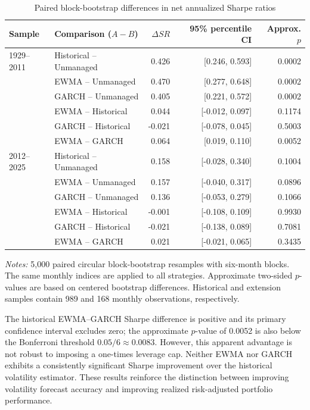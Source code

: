 \documentclass[11pt]{article}
\begin{document}
\begin{table}[htbp]
\centering
\caption{Paired block-bootstrap differences in net annualized Sharpe ratios}
\label{tab:bootstrap_sharpe}
\small
\begin{tabular}{llrrr}
\hline
Sample & Comparison ($A-B$) & $\Delta SR$ & 95\% percentile CI & Approx. $p$ \\
\hline
1929--2011 & Historical -- Unmanaged & 0.426 & [0.246, 0.593] & 0.0002 \\
 & EWMA -- Unmanaged & 0.470 & [0.277, 0.648] & 0.0002 \\
 & GARCH -- Unmanaged & 0.405 & [0.221, 0.572] & 0.0002 \\
 & EWMA -- Historical & 0.044 & [-0.012, 0.097] & 0.1174 \\
 & GARCH -- Historical & -0.021 & [-0.078, 0.045] & 0.5003 \\
 & EWMA -- GARCH & 0.064 & [0.019, 0.110] & 0.0052 \\
\hline
2012--2025 & Historical -- Unmanaged & 0.158 & [-0.028, 0.340] & 0.1004 \\
 & EWMA -- Unmanaged & 0.157 & [-0.040, 0.317] & 0.0896 \\
 & GARCH -- Unmanaged & 0.136 & [-0.053, 0.279] & 0.1066 \\
 & EWMA -- Historical & -0.001 & [-0.108, 0.109] & 0.9930 \\
 & GARCH -- Historical & -0.021 & [-0.138, 0.089] & 0.7081 \\
 & EWMA -- GARCH & 0.021 & [-0.021, 0.065] & 0.3435 \\
\hline
\end{tabular}
\begin{minipage}{0.94\linewidth}\footnotesize\emph{Notes:} 5,000 paired circular block-bootstrap resamples with six-month blocks. The same monthly indices are applied to all strategies. Approximate two-sided $p$-values are based on centered bootstrap differences. Historical and extension samples contain 989 and 168 monthly observations, respectively.\end{minipage}
\end{table}

The historical EWMA--GARCH Sharpe difference is positive and its primary confidence interval excludes zero; the approximate $p$-value of 0.0052 is also below the Bonferroni threshold $0.05/6\approx0.0083$. However, this apparent advantage is not robust to imposing a one-times leverage cap. Neither EWMA nor GARCH exhibits a consistently significant Sharpe improvement over the historical volatility estimator. These results reinforce the distinction between improving volatility forecast accuracy and improving realized risk-adjusted portfolio performance.
\end{document}
